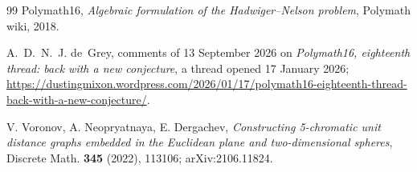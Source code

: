 \documentclass[11pt,reqno]{amsart}
\theoremstyle{plain}
\theoremstyle{definition}
\begin{document}
\begin{thebibliography}{99}
Polymath16,
\emph{Algebraic formulation of the Hadwiger--Nelson problem},
Polymath wiki, 2018.

A.~D.~N.~J. de~Grey,
comments of 13 September 2026 on \emph{Polymath16, eighteenth thread: back with
a new conjecture}, a thread opened 17 January 2026;
\url{https://dustingmixon.wordpress.com/2026/01/17/polymath16-eighteenth-thread-back-with-a-new-conjecture/}.

V. Voronov, A. Neopryatnaya, E. Dergachev,
\emph{Constructing 5-chromatic unit distance graphs embedded in the Euclidean
plane and two-dimensional spheres},
Discrete Math. \textbf{345} (2022), 113106; arXiv:2106.11824.

\end{thebibliography}
\end{document}
